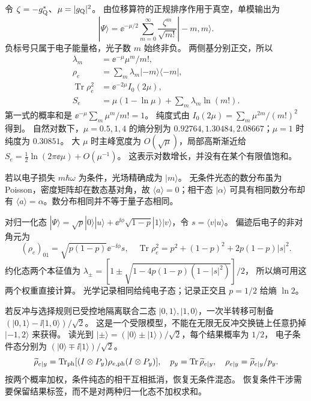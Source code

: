 \begin{exbox}
令 $\zeta=-g_{\rm Q}^*$、$\mu=|g_{\rm Q}|^2$。
由位移算符的正规排序作用于真空，单模输出为
\begin{equation}
|\Psi\rangle=\ee^{-\mu/2}\sum_{m=0}^\infty
\frac{\zeta^m}{\sqrt{m!}}|-m,m\rangle.
\label{eq:feqo-vacuum-joint-state}
\end{equation}
负标号只属于电子能量格，光子数 $m$ 始终非负。
两侧基分别正交，所以
\begin{align}
\lambda_m&=\ee^{-\mu}\mu^m/m!,\label{eq:feqo-vacuum-schmidt}\\
\rho_e&=\sum_m\lambda_m|-m\rangle\langle-m|,
\label{eq:feqo-vacuum-reduced-electron}\\
\operatorname{Tr}\rho_e^2&=\ee^{-2\mu}I_0(2\mu),
\label{eq:feqo-vacuum-purity}\\
S_e&=\mu(1-\ln\mu)+\sum_m\lambda_m\ln(m!).
\label{eq:feqo-vacuum-entropy}
\end{align}
第一式的概率和是 $\ee^{-\mu}\sum_m\mu^m/m!=1$。
纯度式由 $I_0(2\mu)=\sum_m\mu^{2m}/(m!)^2$ 得到。
自然对数下，$\mu=0.5,1,4$ 的熵分别为
$0.92764,1.30484,2.08667$；$\mu=1$ 时纯度为 $0.30851$。
大 $\mu$ 时主峰宽度为 $O(\sqrt\mu)$，局部高斯渐近给
$S_e=\tfrac12\ln(2\pi\ee\mu)+O(\mu^{-1})$。
这表示对数增长，并没有在某个有限值饱和。

若以电子损失 $m\hbar\omega$ 为条件，光场精确成为 $|m\rangle$。
无条件光态的数分布虽为 Poisson，密度矩阵却在数态基对角，故
$\langle a\rangle=0$；相干态 $|\alpha\rangle$ 可具有相同数分布却有
$\langle a\rangle=\alpha$。数分布相同并不等于量子态相同。
\end{exbox}

\begin{exbox}
对归一化态 $|\Psi\rangle=\sqrt p|0\rangle|u\rangle
+\ee^{\ii\phi}\sqrt{1-p}|1\rangle|v\rangle$，令 $s=\langle v|u\rangle$。
偏迹后电子的非对角元为
\begin{equation}
(\rho_e)_{01}=\sqrt{p(1-p)}\ee^{-\ii\phi}s,
\quad\operatorname{Tr}\rho_e^2=p^2+(1-p)^2+2p(1-p)|s|^2.
\label{eq:feqo-which-path-overlap}
\end{equation}
约化态两个本征值为
$\lambda_\pm=[1\pm\sqrt{1-4p(1-p)(1-|s|^2)}]/2$，
所以熵可用这两个权重直接计算。
光学记录相同给纯电子态；记录正交且 $p=1/2$ 给熵 $\ln2$。

若反冲与选择规则已受控地隔离联合二态
$|0,1\rangle,|1,0\rangle$，一次半转移可制备
$(|0,1\rangle-\ii|1,0\rangle)/\sqrt2$。
这是一个受限模型，不能在无限无反冲交换链上任意扔掉 $|-1,2\rangle$ 来获得。
读光到 $|\pm\rangle=(|0\rangle\pm|1\rangle)/\sqrt2$，每个结果概率为 $1/2$，
电子条件态分别为 $(|0\rangle\mp\ii|1\rangle)/\sqrt2$。
\begin{equation}
\widetilde\rho_{e|y}=\operatorname{Tr}_{\rm ph}
[(I\otimes P_y)\rho_{e,\rm ph}(I\otimes P_y)],
\quad p_y=\operatorname{Tr}\widetilde\rho_{e|y},
\quad\rho_{e|y}=\widetilde\rho_{e|y}/p_y.
\label{eq:feqo-conditional-electron-state}
\end{equation}
按两个概率加权，条件纯态的相干互相抵消，恢复无条件混态。
恢复条件干涉需要保留结果标签，而不是对两种归一化态不加权求和。
\end{exbox}
